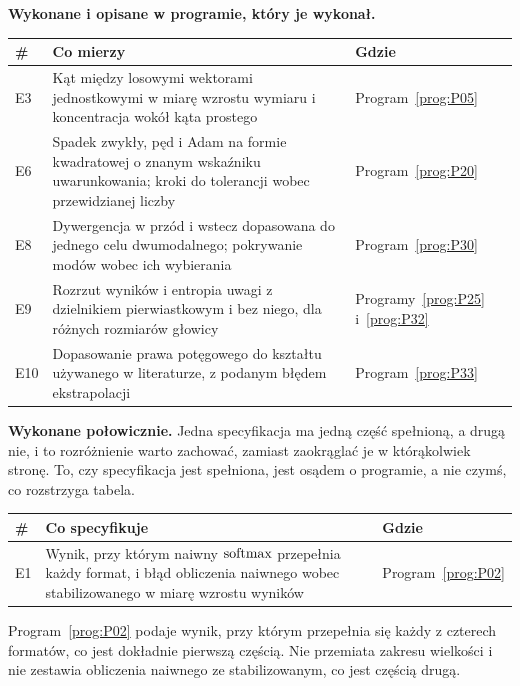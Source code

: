 \medskip
\textbf{Wykonane i opisane w programie, który je wykonał.}

\begin{center}
\begin{tabularx}{\linewidth}{@{}lXl@{}}
\toprule
\textbf{\#} & \textbf{Co mierzy} & \textbf{Gdzie} \\
\midrule
E3 & Kąt między losowymi wektorami jednostkowymi w miarę wzrostu wymiaru i
  koncentracja wokół kąta prostego & Program~\ref{prog:P05} \\
E6 & Spadek zwykły, pęd i Adam na formie kwadratowej o znanym wskaźniku
  uwarunkowania; kroki do tolerancji wobec przewidzianej liczby &
  Program~\ref{prog:P20} \\
E8 & Dywergencja w przód i wstecz dopasowana do jednego celu dwumodalnego;
  pokrywanie modów wobec ich wybierania & Program~\ref{prog:P30} \\
E9 & Rozrzut wyników i entropia uwagi z dzielnikiem pierwiastkowym i bez
  niego, dla różnych rozmiarów głowicy & Programy~\ref{prog:P25}
  i~\ref{prog:P32} \\
E10 & Dopasowanie prawa potęgowego do kształtu używanego w literaturze, z
  podanym błędem ekstrapolacji & Program~\ref{prog:P33} \\
\bottomrule
\end{tabularx}
\end{center}

\medskip
\textbf{Wykonane połowicznie.} Jedna specyfikacja ma jedną część spełnioną, a
drugą nie, i to rozróżnienie warto zachować, zamiast zaokrąglać je w
którąkolwiek stronę. To, czy specyfikacja jest spełniona, jest osądem o
programie, a nie czymś, co rozstrzyga tabela.

\begin{center}
\begin{tabularx}{\linewidth}{@{}lXl@{}}
\toprule
\textbf{\#} & \textbf{Co specyfikuje} & \textbf{Gdzie} \\
\midrule
E1 & Wynik, przy którym naiwny $\operatorname{softmax}$ przepełnia każdy format, i błąd
  obliczenia naiwnego wobec stabilizowanego w miarę wzrostu wyników &
  Program~\ref{prog:P02} \\
\bottomrule
\end{tabularx}
\end{center}

Program~\ref{prog:P02} podaje wynik, przy którym przepełnia się każdy z
czterech formatów, co jest dokładnie pierwszą częścią. Nie przemiata zakresu
wielkości i nie zestawia obliczenia naiwnego ze stabilizowanym, co jest
częścią drugą.

